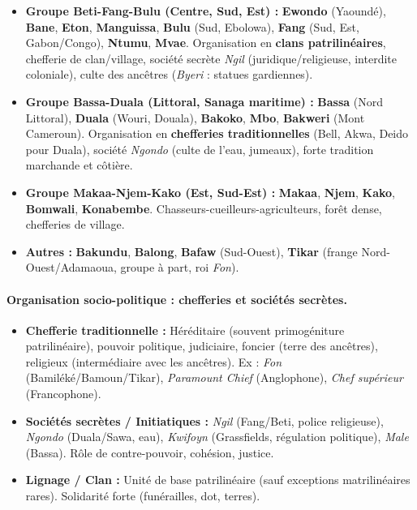 \documentclass[11pt]{article}
\begin{document}
\begin{itemize}
    \item \textbf{Groupe Beti-Fang-Bulu (Centre, Sud, Est) :} \textbf{Ewondo} (Yaoundé), \textbf{Bane}, \textbf{Eton}, \textbf{Manguissa}, \textbf{Bulu} (Sud, Ebolowa), \textbf{Fang} (Sud, Est, Gabon/Congo), \textbf{Ntumu}, \textbf{Mvae}. Organisation en \textbf{clans patrilinéaires}, chefferie de clan/village, société secrète \emph{Ngil} (juridique/religieuse, interdite coloniale), culte des ancêtres (\emph{Byeri} : statues gardiennes).
    \item \textbf{Groupe Bassa-Duala (Littoral, Sanaga maritime) :} \textbf{Bassa} (Nord Littoral), \textbf{Duala} (Wouri, Douala), \textbf{Bakoko}, \textbf{Mbo}, \textbf{Bakweri} (Mont Cameroun). Organisation en \textbf{chefferies traditionnelles} (Bell, Akwa, Deido pour Duala), société \emph{Ngondo} (culte de l'eau, jumeaux), forte tradition marchande et côtière.
    \item \textbf{Groupe Makaa-Njem-Kako (Est, Sud-Est) :} \textbf{Makaa}, \textbf{Njem}, \textbf{Kako}, \textbf{Bomwali}, \textbf{Konabembe}. Chasseurs-cueilleurs-agriculteurs, forêt dense, chefferies de village.
    \item \textbf{Autres :} \textbf{Bakundu}, \textbf{Balong}, \textbf{Bafaw} (Sud-Ouest), \textbf{Tikar} (frange Nord-Ouest/Adamaoua, groupe à part, roi \emph{Fon}).
\end{itemize}

\paragraph{Organisation socio-politique : chefferies et sociétés secrètes.}
\begin{itemize}
    \item \textbf{Chefferie traditionnelle :} Héréditaire (souvent primogéniture patrilinéaire), pouvoir politique, judiciaire, foncier (terre des ancêtres), religieux (intermédiaire avec les ancêtres). Ex : \emph{Fon} (Bamiléké/Bamoun/Tikar), \emph{Paramount Chief} (Anglophone), \emph{Chef supérieur} (Francophone).
    \item \textbf{Sociétés secrètes / Initiatiques :} \emph{Ngil} (Fang/Beti, police religieuse), \emph{Ngondo} (Duala/Sawa, eau), \emph{Kwifoyn} (Grassfields, régulation politique), \emph{Male} (Bassa). Rôle de contre-pouvoir, cohésion, justice.
    \item \textbf{Lignage / Clan :} Unité de base patrilinéaire (sauf exceptions matrilinéaires rares). Solidarité forte (funérailles, dot, terres).
\end{itemize}
\end{document}
